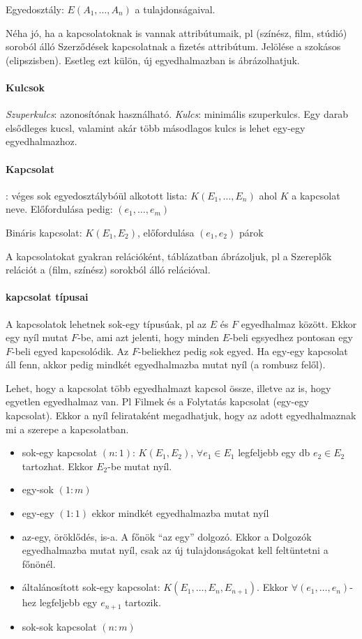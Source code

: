 \documentclass[fleqn,10pt,a4paper]{article}
\theoremstyle{magyar}
\begin{document}
  Egyedosztály: $E(A_1,\ldots,A_n)$ a tulajdonságaival.
  
  

  Néha jó, ha a kapcsolatoknak is vannak attribútumaik, pl (színész, film, stúdió) soroból álló Szerződések kapcsolatnak
  a fizetés attribútum. Jelölése a szokásos (elipszisben). Esetleg ezt külön, új egyedhalmazban is ábrázolhatjuk.

  \paragraph{Kulcsok}
  \emph{Szuperkulcs}: azonosítónak használható. \emph{Kulcs}: minimális szuperkulcs. Egy darab elsődleges kucsl,
  valamint akár több másodlagos kulcs is lehet egy-egy egyedhalmazhoz.

  \paragraph{Kapcsolat}: véges sok egyedosztálybóül alkotott lista: $K(E_1,\ldots,E_n)$ ahol $K$ a kapcsolat neve. Előfordulása
  pedig: $(e_1,\dotsc,e_m)$
  
  Bináris kapcsolat: $K(E_1,E_2)$, előfordulása $(e_1,e_2)$ párok

  A kapcsolatokat gyakran relációként, táblázatban ábrázoljuk, pl a Szereplők relációt a (film, színész) sorokból álló
  relációval.
  
  
  \paragraph{kapcsolat típusai}
  A kapcsolatok lehetnek sok-egy típusúak, pl az $E$ és $F$ egyedhalmaz között. Ekkor egy nyíl mutat $F$-be, ami azt
  jelenti, hogy minden $E$-beli egsyedhez pontosan egy $F$-beli egyed kapcsolódik. Az $F$-beliekhez pedig sok egyed.
  Ha egy-egy kapcsolat áll fenn, akkor pedig mindkét egyedhalmazba mutat nyíl (a rombusz felől).


  Lehet, hogy a kapcsolat több egyedhalmazt kapcsol össze, illetve az is, hogy egyetlen egyedhalmaz van. Pl Filmek és a
  Folytatás kapcsolat (egy-egy kapcsolat). Ekkor a nyíl felirataként megadhatjuk, hogy az adott egyedhalmaznak mi a
  szerepe a kapcsolatban.

  \begin{itemize}
  \item sok-egy kapcsolat $(n:1)$: $K(E_1,E_2)$, $\forall e_1\in E_1$ legfeljebb egy db $e_2\in E_2$ tartozhat. Ekkor $E_2$-be
    mutat nyíl.
  \item egy-sok  $(1:m)$
  \item egy-egy $(1:1)$ ekkor mindkét egyedhalmazba mutat nyíl
  \item az-egy, öröklődés, is-a. A főnök ``az egy'' dolgozó. Ekkor a Dolgozók egyedhalmazba mutat nyíl, csak az új
    tulajdonságokat kell feltüntetni a főnönél.
  \item általánosított sok-egy kapcsolat: $K(E_1,\ldots,E_n,E_{n+1})$. Ekkor $\forall (e_1,\ldots,e_n)$-hez legfeljebb
    egy $e_{n+1}$ tartozik.
  \item sok-sok kapcsolat $(n:m)$

  \end{itemize}
\end{document}
